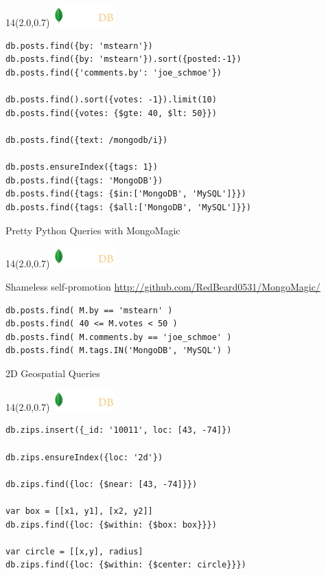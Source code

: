 \documentclass{beamer}
\newcommand{\MongoLogo}{
\begin{textblock}{14}(2.0,0.7)
  \includegraphics[height=0.8cm]{logo-mongodb-ondark.png}
\end{textblock}
}
\begin{document}
\begin{frame}[fragile]
  \MongoLogo

  \begin{lstlisting}
db.posts.find({by: 'mstearn'})
db.posts.find({by: 'mstearn'}).sort({posted:-1})
db.posts.find({'comments.by': 'joe_schmoe'})

db.posts.find().sort({votes: -1}).limit(10)
db.posts.find({votes: {$gte: 40, $lt: 50}}) 

db.posts.find({text: /mongodb/i})

db.posts.ensureIndex({tags: 1})
db.posts.find({tags: 'MongoDB'})
db.posts.find({tags: {$in:['MongoDB', 'MySQL']}})
db.posts.find({tags: {$all:['MongoDB', 'MySQL']}})
  \end{lstlisting}
\end{frame}

\begin{frame}[fragile]{Pretty Python Queries with MongoMagic}
  \MongoLogo

  \begin{block}{Shameless self-promotion}
    \url{http://github.com/RedBeard0531/MongoMagic/}
  \end{block}

  \begin{lstlisting}
db.posts.find( M.by == 'mstearn' )
db.posts.find( 40 <= M.votes < 50 ) 
db.posts.find( M.comments.by == 'joe_schmoe' )
db.posts.find( M.tags.IN('MongoDB', 'MySQL') )
  \end{lstlisting}
\end{frame}

\begin{frame}[fragile]{2D Geospatial Queries}
  \MongoLogo

  \small
  \begin{lstlisting}
db.zips.insert({_id: '10011', loc: [43, -74]})

db.zips.ensureIndex({loc: '2d'})

db.zips.find({loc: {$near: [43, -74]}})

var box = [[x1, y1], [x2, y2]]
db.zips.find({loc: {$within: {$box: box}}})

var circle = [[x,y], radius]
db.zips.find({loc: {$within: {$center: circle}}})
                 
  \end{lstlisting}
\end{frame}
\end{document}
